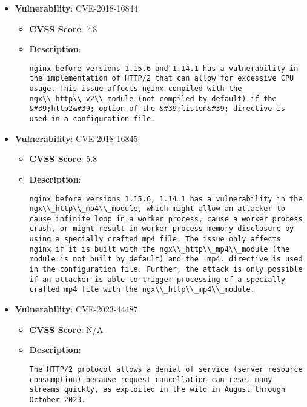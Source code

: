 \documentclass{article}
\begin{document}
\begin{itemize}
        \item \textbf{Vulnerability}: CVE-2018-16844
        \begin{itemize}
            \item \textbf{CVSS Score}:  7.8 
            \item \textbf{Description}:
            \parbox[t]{0.9\linewidth}{
                \verb|nginx before versions 1.15.6 and 1.14.1 has a vulnerability in the implementation of HTTP/2 that can allow for excessive CPU usage. This issue affects nginx compiled with the ngx\\_http\\_v2\\_module (not compiled by default) if the &#39;http2&#39; option of the &#39;listen&#39; directive is used in a configuration file.|
            }
        \end{itemize}
    
        \item \textbf{Vulnerability}: CVE-2018-16845
        \begin{itemize}
            \item \textbf{CVSS Score}:  5.8 
            \item \textbf{Description}:
            \parbox[t]{0.9\linewidth}{
                \verb|nginx before versions 1.15.6, 1.14.1 has a vulnerability in the ngx\\_http\\_mp4\\_module, which might allow an attacker to cause infinite loop in a worker process, cause a worker process crash, or might result in worker process memory disclosure by using a specially crafted mp4 file. The issue only affects nginx if it is built with the ngx\\_http\\_mp4\\_module (the module is not built by default) and the .mp4. directive is used in the configuration file. Further, the attack is only possible if an attacker is able to trigger processing of a specially crafted mp4 file with the ngx\\_http\\_mp4\\_module.|
            }
        \end{itemize}
    
        \item \textbf{Vulnerability}: CVE-2023-44487
        \begin{itemize}
            \item \textbf{CVSS Score}:  N/A 
            \item \textbf{Description}:
            \parbox[t]{0.9\linewidth}{
                \verb|The HTTP/2 protocol allows a denial of service (server resource consumption) because request cancellation can reset many streams quickly, as exploited in the wild in August through October 2023.|
            }
        \end{itemize}
    

\end{itemize}
\end{document}
